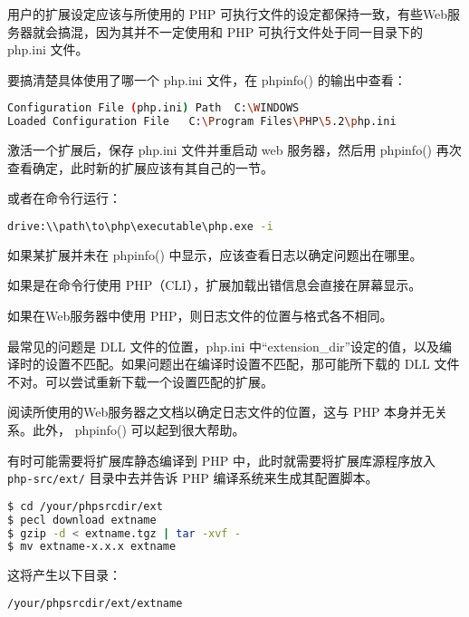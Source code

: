 用户的扩展设定应该与所使用的 PHP 可执行文件的设定都保持一致，有些Web服务器就会搞混，因为其并不一定使用和 PHP 可执行文件处于同一目录下的 php.ini 文件。

要搞清楚具体使用了哪一个 php.ini 文件，在 phpinfo() 的输出中查看：


\begin{lstlisting}[language=bash]
Configuration File (php.ini) Path  C:\WINDOWS
Loaded Configuration File   C:\Program Files\PHP\5.2\php.ini
\end{lstlisting}

激活一个扩展后，保存 php.ini 文件并重启动 web 服务器，然后用 phpinfo() 再次查看确定，此时新的扩展应该有其自己的一节。

或者在命令行运行：

\begin{lstlisting}[language=bash]
drive:\\path\to\php\executable\php.exe -i
\end{lstlisting}

如果某扩展并未在 phpinfo() 中显示，应该查看日志以确定问题出在哪里。

\begin{compactitem}
\item 如果是在命令行使用 PHP（CLI），扩展加载出错信息会直接在屏幕显示。
\item 如果在Web服务器中使用 PHP，则日志文件的位置与格式各不相同。
\end{compactitem}

最常见的问题是 DLL 文件的位置，php.ini 中“extension\_dir”设定的值，以及编译时的设置不匹配。如果问题出在编译时设置不匹配，那可能所下载的 DLL 文件不对。可以尝试重新下载一个设置匹配的扩展。

阅读所使用的Web服务器之文档以确定日志文件的位置，这与 PHP 本身并无关系。此外， phpinfo() 可以起到很大帮助。

有时可能需要将扩展库静态编译到 PHP 中，此时就需要将扩展库源程序放入 \texttt{php-src/ext/} 目录中去并告诉 PHP 编译系统来生成其配置脚本。


\begin{lstlisting}[language=bash]
$ cd /your/phpsrcdir/ext
$ pecl download extname
$ gzip -d < extname.tgz | tar -xvf -
$ mv extname-x.x.x extname
\end{lstlisting}

这将产生以下目录：

\begin{lstlisting}[language=bash]
/your/phpsrcdir/ext/extname
\end{lstlisting}

